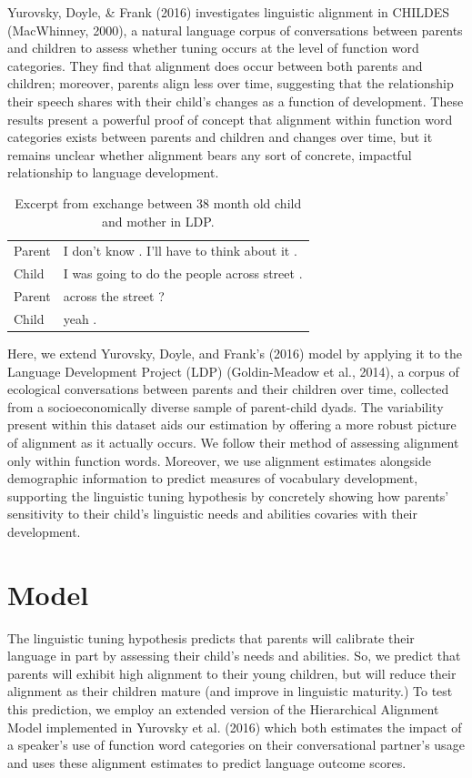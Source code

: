 \documentclass[10pt, letterpaper]{article}
\begin{document}
Yurovsky, Doyle, \& Frank (2016) investigates linguistic alignment in
CHILDES (MacWhinney, 2000), a natural language corpus of conversations
between parents and children to assess whether tuning occurs at the
level of function word categories. They find that alignment does occur
between both parents and children; moreover, parents align less over
time, suggesting that the relationship their speech shares with their
child's changes as a function of development. These results present a
powerful proof of concept that alignment within function word categories
exists between parents and children and changes over time, but it
remains unclear whether alignment bears any sort of concrete, impactful
relationship to language development.

\begin{table}[H]
\centering
\begin{tabular}{ll}
  \hline
  \hline
Parent & I don't know . I'll have to think about it . \\ 
  Child & I was going to do the people across street . \\ 
  Parent & across the street ? \\ 
  Child & yeah . \\ 
   \hline
\end{tabular}
\caption{Excerpt from exchange between 38 month old child and mother in LDP.} 
\end{table}

Here, we extend Yurovsky, Doyle, and Frank's (2016) model by applying it
to the Language Development Project (LDP) (Goldin-Meadow et al., 2014),
a corpus of ecological conversations between parents and their children
over time, collected from a socioeconomically diverse sample of
parent-child dyads. The variability present within this dataset aids our
estimation by offering a more robust picture of alignment as it actually
occurs. We follow their method of assessing alignment only within
function words. Moreover, we use alignment estimates alongside
demographic information to predict measures of vocabulary development,
supporting the linguistic tuning hypothesis by concretely showing how
parents' sensitivity to their child's linguistic needs and abilities
covaries with their development.

\hypertarget{model}{%
\section{Model}\label{model}}

The linguistic tuning hypothesis predicts that parents will calibrate
their language in part by assessing their child's needs and abilities.
So, we predict that parents will exhibit high alignment to their young
children, but will reduce their alignment as their children mature (and
improve in linguistic maturity.) To test this prediction, we employ an
extended version of the Hierarchical Alignment Model implemented in
Yurovsky et al. (2016) which both estimates the impact of a speaker's
use of function word categories on their conversational partner's usage
and uses these alignment estimates to predict language outcome scores.
\end{document}
